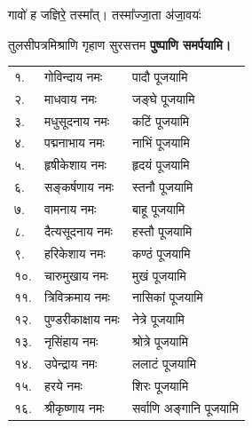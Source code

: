 \begin{center}
{गावो॑ ह जज्ञिरे॒ तस्मा᳚त्। तस्मा᳚ज्जा॒ता अ॑जा॒वयः॑}

{तुलसीपत्रमिश्राणि गृहाण सुरसत्तम}
\textbf{\devAya{} पुष्पाणि समर्पयामि।}

\begin{longtable}{ll@{—}l}
१. & गोविन्दाय नमः & पादौ पूजयामि\\
२. & माधवाय नमः & जङ्घे पूजयामि\\
३. & मधुसूदनाय नमः & कटिं पूजयामि\\
४. & पद्मनाभाय नमः & नाभिं पूजयामि\\
५. & हृषीकेशाय नमः & हृदयं पूजयामि\\
६. & सङ्कर्षणाय नमः & स्तनौ पूजयामि\\
७. & वामनाय नमः & बाहू पूजयामि\\
८. & दैत्यसूदनाय नमः & हस्तौ पूजयामि\\
९. & हरिकेशाय नमः & कण्ठं पूजयामि\\
१०. & चारुमुखाय नमः & मुखं पूजयामि\\
११. & त्रिविक्रमाय नमः & नासिकां पूजयामि\\
१२. & पुण्डरीकाक्षाय नमः & नेत्रे पूजयामि\\
१३. & नृसिंहाय नमः & श्रोत्रे पूजयामि\\
१४. & उपेन्द्राय नमः & ललाटं पूजयामि\\
१५. & हरये नमः & शिरः पूजयामि\\
१६. & श्रीकृष्णाय नमः & सर्वाणि अङ्गानि पूजयामि\\
\end{longtable}


\end{center}
